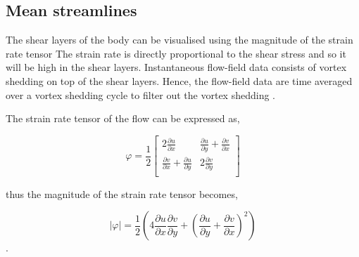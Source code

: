%
%
%
%
%
%
%


\subsection{Mean streamlines}

The shear layers of the body can be visualised using the magnitude of the strain rate tensor The strain rate is directly proportional to the shear stress and so it will be high in the shear layers. Instantaneous flow-field data consists of vortex shedding on top of the shear layers. Hence, the flow-field data are time averaged over a vortex shedding cycle to filter out the vortex shedding . 

The strain rate tensor of the flow can be expressed as,

\begin{equation}
\varphi = \frac{1}{2}
\begin{bmatrix}
2\frac{\partial u}{\partial x} & \frac{\partial u}{\partial y} + \frac{\partial v}{\partial x} \\
\frac{\partial v}{\partial x} + \frac{\partial u}{\partial y} & 2\frac{\partial v}{\partial y} \\
\end{bmatrix}
\end{equation}

thus the magnitude of the strain rate tensor becomes,

\begin{equation}
|\varphi| = \frac{1}{2}\left(4\frac{\partial u}{\partial x}\frac{\partial v}{\partial y} + \left(\frac{\partial u}{\partial y} + \frac{\partial v}{\partial x}\right)^2\right)
\end{equation}.



